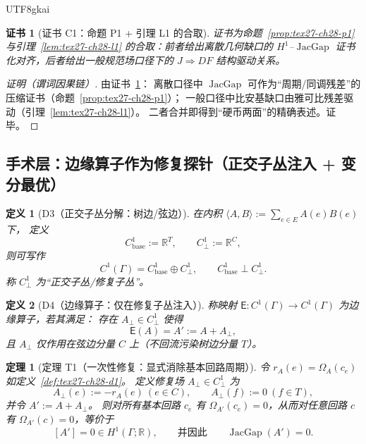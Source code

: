 \documentclass[12pt]{article}
\newtheorem{definition}{定义}[section]
\newtheorem{theorem}{定理}[section]
\newtheorem{Certificate}{证书}[section]
\newcommand{\RR}{\mathbb{R}}
\newcommand{\JacGap}{\operatorname{JacGap}}
\begin{document}
\begin{CJK*}{UTF8}{gkai}
\begin{Certificate}[证书 C1：命题 P1 + 引理 L1 的合取]
\label{cert:tex27-ch28-c1}
证书为命题~\ref{prop:tex27-ch28-p1} 与引理~\ref{lem:tex27-ch28-l1} 的合取：前者给出离散几何缺口的 $H^1$--$\JacGap$ 证书化对齐，后者给出一般规范场口径下的
  $J\Rightarrow DF$ 结构驱动关系。
\end{Certificate}

\begin{proof}[证明（谓词因果链）]
由证书~\ref{cert:tex27-ch28-c1}：
离散口径中 $\JacGap$ 可作为“周期/同调残差”的压缩证书（命题~\ref{prop:tex27-ch28-p1}）；
一般口径中比安基缺口由雅可比残差驱动（引理~\ref{lem:tex27-ch28-l1}）。
二者合并即得到“硬币两面”的精确表述。证毕。
\end{proof}

\subsection{手术层：边缘算子作为修复探针（正交子丛注入 + 变分最优）}
\label{subsec:tex27-ch28-surgery}

\begin{definition}[D3（正交子丛分解：树边/弦边）]
\label{def:tex27-ch28-d3}
在内积 $\langle A,B\rangle:=\sum_{e\in E}A(e)B(e)$ 下，
定义
\[
  C^1_{\mathrm{base}}:=\RR^{T},
  \qquad
  C^1_{\perp}:=\RR^{C},
\]
则可写作
\[
  C^1(\Gamma)=C^1_{\mathrm{base}}\oplus C^1_{\perp},
  \qquad
  C^1_{\mathrm{base}}\perp C^1_{\perp}.
\]
称 $C^1_{\perp}$ 为“正交子丛/修复子丛”。
\end{definition}

\begin{definition}[D4（边缘算子：仅在修复子丛注入）]
\label{def:tex27-ch28-d4}
称映射 $\mathsf E:C^1(\Gamma)\to C^1(\Gamma)$ 为边缘算子，若其满足：
存在 $A_\perp\in C^1_\perp$ 使得
\[
  \mathsf E(A)=A':=A+A_\perp,
\]
且 $A_\perp$ 仅作用在弦边分量 $C$ 上（不回流污染树边分量 $T$）。
\end{definition}

\begin{theorem}[定理 T1（一次性修复：显式消除基本回路周期）]
\label{thm:tex27-ch28-t1}
令 $r_A(e)=\Omega_A(c_e)$ 如定义~\ref{def:tex27-ch28-d1}。
定义修复场 $A_\perp\in C^1_\perp$ 为
\[
  A_\perp(e):=-r_A(e)\ (e\in C),
  \qquad
  A_\perp(f):=0\ (f\in T),
\]
并令 $A':=A+A_\perp$。
则对所有基本回路 $c_e$ 有 $\Omega_{A'}(c_e)=0$，从而对任意回路 $c$ 有 $\Omega_{A'}(c)=0$，等价于
\[
  [A']=0\in H^1(\Gamma;\RR),
  \qquad
  \text{并因此}\qquad
  \JacGap(A')=0.
\]
\end{theorem}


\end{CJK*}
\end{document}
